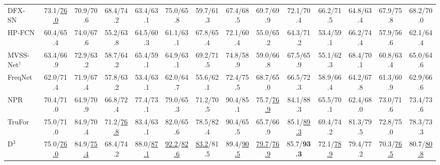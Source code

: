 \documentclass[sigconf, screen, review, anonymous]{acmart}
\begin{document}
\begin{table}[t]
\begin{adjustbox}{width=\textwidth, scale=2}
\begin{tabular}{L CCCCCCCCCCCC C}
        DFX-SN~\cite{pontorno2025deepfeaturex}
            & 73.1/\underline{\Huge 76.0} & 70.9/70.6 & 68.4/74.2
            & 63.4/63.1 & 75.0/65.8 & 59.7/61.3
            & 67.4/68.5 & 69.7/69.9 & 72.1/70.4
            & 66.2/71.5 & 64.8/63.4 & 67.9/75.8
            & 68.2/70.0 \\

        HP-FCN \cite{li2019localization}
            & 60.4/65.4 & 74.0/67.6 & 55.2/63.8
            & 64.5/60.3 & 61.1/63.1 & 67.8/65.4
            & 72.1/60.4 & 55.0/65.2 & 64.3/71.2
            & 53.4/59.1 & 66.2/74.4 & 57.9/56.6
            & 62.1/64.4 \\

        MVSS-Net$^\dagger$ \cite{chen2021image}
            & 63.4/66.9 & 72.9/63.2 & 58.7/64.2
            & 65.4/59.1 & 64.9/63.1 & 69.2/71.5
            & 74.8/58.9 & 59.0/66.8 & 67.5/65.9
            & 55.1/62.3 & 68.4/70.1 & 60.8/63.4
            & 65.0/64.6 \\

        FreqNet~\cite{tan2024frequency}
            & 62.0/71.4 & 71.9/67.4 & 57.8/63.2
            & 53.4/63.1 & 62.0/64.7 & 55.6/62.1
            & 72.4/75.5 & 68.7/65.0 & 66.5/72.3
            & 58.9/66.4 & 64.2/67.8 & 61.3/60.9
            & 62.9/66.6 \\

        NPR~\cite{tan2024rethinking}
            & 70.4/71.0 & 64.9/70.9 & 66.8/72.4
            & 77.4/73.1 & 79.0/65.3 & 71.2/70.5
            & 90.4/85.1 & 75.7/\underline{\Huge 76.9} & 84.1/88.3
            & 65.5/70.1 & 62.4/68.0 & 73.0/71.6
            & 73.4/73.6 \\

        TruFor \cite{guillaro2023trufor}
            & 75.0/71.0 & 84.9/70.4 & 71.2/\underline{\Huge 76.8}
            & 83.4/63.1 & 82.0/65.6 & 78.5/82.4
            & 90.4/65.5 & 65.7/66.9 & 85.1/\underline{\Huge 89.3}
            & 69.4/74.2 & 81.3/79.5 & 72.8/75.0
            & 78.3/73.3 \\

        D$^3$~\cite{yang2025d}
            & 75.0/\underline{\Huge 76.0} & 84.9/\underline{\Huge 75.4} & 68.4/74.2
            & 88.0/\underline{\Huge 87.1} & \underline{\Huge 92.2}/\underline{\Huge 82.6} & \underline{\Huge 83.2}/81.5
            & 89.4/\underline{\Huge 90.5} & \underline{\Huge 79.7}/\underline{\Huge 76.9} & 85.7/\textbf{\Huge 93.3}
            & 72.1/\underline{\Huge 78.9} & 79.4/77.2 & 70.3/\underline{\Huge 76.5}
            & 80.7/\underline{\Huge 80.8} \\


\end{tabular}
\end{adjustbox}
\end{table}
\end{document}
